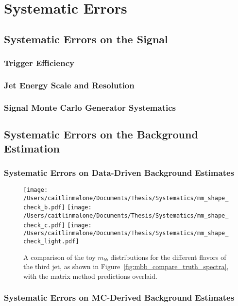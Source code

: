  

\chapter[Systematics]{Systematic Errors}

\section{Systematic Errors on the Signal}
\subsection{Trigger Efficiency}
\subsection{Jet Energy Scale and Resolution}
\subsection{Signal Monte Carlo Generator Systematics}

\section{Systematic Errors on the Background Estimation}
\subsection{Systematic Errors on Data-Driven Background Estimates}

\begin{figure}
    \centering
    \texttt{[image: /Users/caitlinmalone/Documents/Thesis/Systematics/mm\_shape\_check\_b.pdf]}
    \texttt{[image: /Users/caitlinmalone/Documents/Thesis/Systematics/mm\_shape\_check\_c.pdf]}
    \texttt{[image: /Users/caitlinmalone/Documents/Thesis/Systematics/mm\_shape\_check\_light.pdf]}
    \caption{A comparison of the toy $m_{bb}$ distributions for the different flavors of the
        third jet, as shown in Figure~\ref{fig:mbb_compare_truth_spectra}, with the matrix
        method predictions overlaid.  }
    \label{fig:mbb_compare_truth_mm_toy}
\end{figure}

\subsection{Systematic Errors on MC-Derived Background Estimates}






